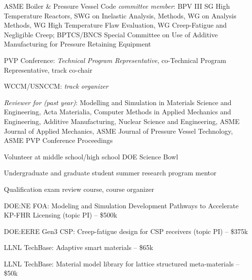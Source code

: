 ASME Boiler \& Pressure Vessel Code \emph{committee member}:  BPV III SG High Temperature Reactors,
SWG on Inelastic Analysis,
Methods, WG on Analysis Methods, WG High Temperature Flaw Evaluation, 
WG Creep-Fatigue and Negligible Creep; BPTCS/BNCS Special Committee on 
Use of Additive Manufacturing for Pressure Retaining Equipment 

PVP Conference:  \emph{Technical Program Representative}, co-Technical Program Representative, track co-chair

WCCM/USNCCM:  \emph{track organizer} 

\emph{Reviewer for (past year)}:   
Modelling and Simulation in Materials Science and Engineering,
Acta Materialia,
Computer Methods in Applied Mechanics and Engineering,
Additive Manufacturing,
Nuclear Science and Engineering,
ASME Journal of Applied Mechanics,
ASME Journal of Pressure Vessel Technology,
ASME PVP Conference Proceedings 


Volunteer at middle school/high school DOE Science Bowl 

Undergraduate and graduate student summer research program mentor 

Qualification exam review course, course organizer 


DOE:NE FOA: Modeling and Simulation Development Pathways to Accelerate KP-FHR Licensing (topic PI) -- \$500k 

DOE:EERE Gen3 CSP: Creep-fatigue design for CSP receivers (topic PI) -- \$375k 

LLNL TechBase: Adaptive smart materials -- \$65k 

LLNL TechBase: Material model library for lattice structured meta-materials
-- \$50k 

\extra


\nocite{*}


\printbibliography[keyword=refereed,heading=none]


\printbibliography[keyword=pending,heading=none]


\printbibliography[keyword=conf,heading=none]


\printbibliography[keyword=patents,heading=none]


\printbibliography[keyword=nonref,heading=none]


\printbibliography[keyword=invited,heading=none]



